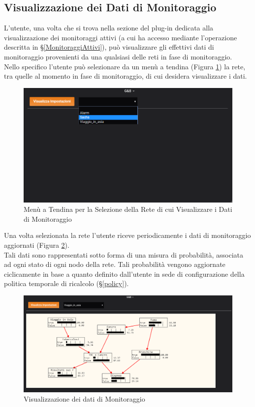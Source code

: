 \subsection{Visualizzazione dei Dati di Monitoraggio}\label{VisualDati}

L'utente, una volta che si trova nella sezione del plug-in dedicata alla visualizzazione dei monitoraggi attivi (a cui ha accesso mediante l'operazione descritta in §\ref{MonitoraggiAttivi}), può visualizzare gli effettivi dati di monitoraggio provenienti da una qualsiasi delle reti in fase di monitoraggio.\\
Nello specifico l'utente può selezionare da un menù a tendina (Figura \ref{SelezioneMonitoraggio}) la rete, tra quelle al momento in fase di monitoraggio, di cui desidera visualizzare i dati.

\begin{figure}[H]
	\begin{center}
		\includegraphics[scale=0.7]{./images/SelezioneMonitoraggio.png}
		 \caption{Menù a Tendina per la Selezione della Rete di cui Visualizzare i Dati di Monitoraggio}	
		 \label{SelezioneMonitoraggio}
	\end{center}
\end{figure}

Una volta selezionata la rete l'utente riceve periodicamente i dati di monitoraggio aggiornati (Figura \ref{DatiMonitoraggio}).\\
Tali dati sono rappresentati sotto forma di una misura di probabilità, associata ad ogni stato di ogni nodo della rete. Tali probabilità vengono aggiornate ciclicamente in base a quanto definito dall'utente in sede di configurazione della politica temporale di ricalcolo (§\ref{policy}).

\begin{figure}[H]
	\begin{center}
		\includegraphics[scale=0.5]{./images/DatiMonitoraggio.png}
		 \caption{Visualizzazione dei dati di Monitoraggio}	
		 \label{DatiMonitoraggio}
	\end{center}
\end{figure}
